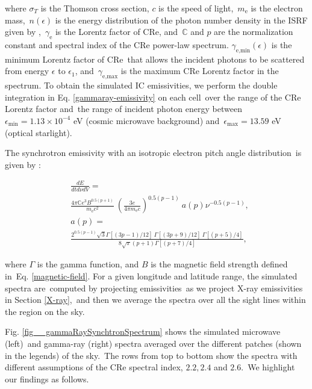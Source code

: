 \documentclass[fleqn,usenatbib,useAMS]{mnras}
\begin{document}
where $\sigma_{T}$ is the Thomson cross section, $c$ is the speed of light,\
$m_{\text{e}}$ is the electron mass,\
$n(\epsilon)$ is the energy distribution of the photon number density in the ISRF given by \citet{Porter2017},\
$\gamma_{\text{e}}$ is the Lorentz factor of CRe, and\
$\mathbb{C}$ and $p$ are the normalization constant and spectral index of the CRe power-law spectrum.
$\gamma_{\text{e,min}}(\epsilon)$ is the minimum Lorentz factor of CRe\
that allows the incident photons to be scattered from energy $\epsilon$ to $\epsilon_{1}$, and\
$\gamma_{\text{e,max}}$ is the maximum CRe Lorentz factor in the spectrum. To obtain the simulated IC emissivities, we perform the double integration in Eq. \ref{gammaray-emissivity} on each cell\
over the range of the CRe Lorentz factor and\
the range of incident photon energy between\
$\epsilon_{\text{min}}=1.13\times10^{-4}$ eV (cosmic microwave background) and\
$\epsilon_{\text{max}}=13.59$ eV (optical starlight).\


The synchrotron emissivity with an isotropic electron pitch angle distribution\
is given by \citet{BLUMENTHAL1970}:

\begin{subequations}
   \begin{align}
      &\frac{dE}{dtd\nu dV} =\nonumber\\
      &\frac{4\pi\mathbb{C}e^{3}B^{0.5(p+1)}}{m_{\text{e}}c^{2}}\
      \left(\frac{3e}{4\pi m_{\text{e}}c}\right)^{0.5(p-1)}\
      a(p)\nu^{-0.5(p-1)},\\
      &a(p)=\nonumber\\
           &\frac{2^{0.5(p-1)}\sqrt{3}\Gamma\left[\left(3p-1\right)/12\right]\
                                      \Gamma\left[\left(3p+9\right)/12\right]\
                                      \Gamma\left[\left(p+5\right)/4\right]}
      {8\sqrt{\pi}(p+1)\Gamma\left[\left(p+7\right)/4\right]},
   \end{align}
   \label{synchrotron-emissivity}
\end{subequations}

where $\Gamma$ is the gamma function, and $B$ is the magnetic field strength defined in\
Eq. \ref{magnetic-field}. For a given longitude and latitude range, the simulated spectra are\
computed by projecting emissivities\
as we project X-ray emissivities in Section \ref{X-ray},\
and then we average the spectra over all the sight lines within the region on the sky.


Fig. \ref{fig__gammaRaySynchtronSpectrum} shows the simulated microwave (left)\
and gamma-ray (right) spectra averaged over the different patches (shown in the legends) of the sky.\
The rows from top to bottom show the spectra with different assumptions of the CRe spectral index, $2.2, 2.4$ and $2.6$.\
We highlight our findings as follows.\
\end{document}
